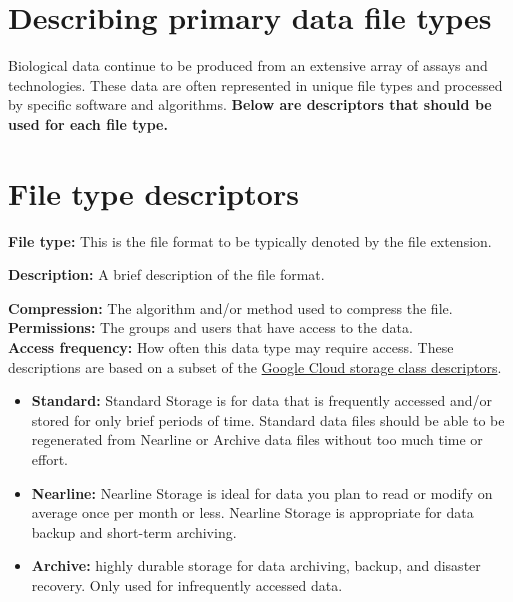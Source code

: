 \documentclass[
  11pt,
]{book}
\providecommand{\tightlist}{%
  \setlength{\itemsep}{0pt}\setlength{\parskip}{0pt}}
\begin{document}
\hypertarget{describing-primary-data-file-types}{%
\section{Describing primary data file types}\label{describing-primary-data-file-types}}

Biological data continue to be produced from an extensive array of assays and technologies. These data are often represented in unique file types and processed by specific software and algorithms. \textbf{Below are descriptors that should be used for each file type.}

\hypertarget{file-type-descriptors}{%
\section{File type descriptors}\label{file-type-descriptors}}

\textbf{File type:} This is the file format to be typically denoted by the file extension.

\textbf{Description:} A brief description of the file format.

\textbf{Compression:} The algorithm and/or method used to compress the file.\\

\textbf{Permissions:} The groups and users that have access to the data.\\

\textbf{Access frequency:} How often this data type may require access. These descriptions are based on a subset of the \href{https://cloud.google.com/storage/docs/storage-classes\#classes}{Google Cloud storage class descriptors}.

\begin{itemize}
\tightlist
\item
  \textbf{Standard:} Standard Storage is for data that is frequently accessed and/or stored for only brief periods of time. Standard data files should be able to be regenerated from Nearline or Archive data files without too much time or effort.
\item
  \textbf{Nearline:} Nearline Storage is ideal for data you plan to read or modify on average once per month or less. Nearline Storage is appropriate for data backup and short-term archiving.
\item
  \textbf{Archive:} highly durable storage for data archiving, backup, and disaster recovery. Only used for infrequently accessed data.
\end{itemize}
\end{document}
